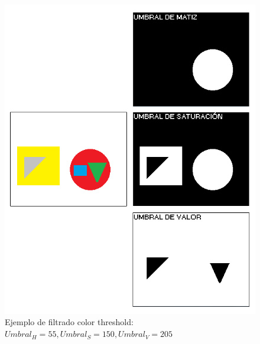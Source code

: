 {		\begin{figure}[!htbp]
		\centering
		\includegraphics[scale=0.47]{graphics/colorthreshold.png}
		\caption{Ejemplo de filtrado color threshold: $Umbral_{H} = 55, Umbral_{S} = 150, Umbral_{V} = 205$}
		\label{fig:colorthres1}
		\end{figure}
	
}
